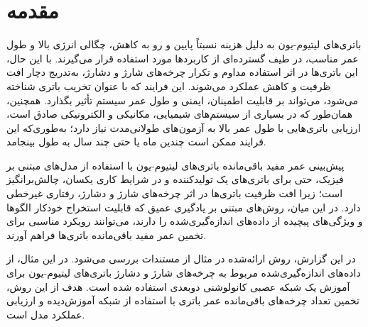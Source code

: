 \section{مقدمه}

باتری‌های لیتیوم-یون به دلیل هزینه نسبتاً پایین و رو به کاهش، چگالی انرژی بالا و طول عمر مناسب، در طیف گسترده‌ای از کاربردها مورد استفاده قرار می‌گیرند. با این حال، این باتری‌ها در اثر استفاده مداوم و تکرار چرخه‌های شارژ و دشارژ، به‌تدریج دچار افت ظرفیت و کاهش عملکرد می‌شوند. این فرایند که با عنوان تخریب باتری شناخته می‌شود، می‌تواند بر قابلیت اطمینان، ایمنی و طول عمر سیستم تأثیر بگذارد. همچنین، همان‌طور که در بسیاری از سیستم‌های شیمیایی، مکانیکی و الکترونیکی صادق است، ارزیابی باتری‌هایی با طول عمر بالا به آزمون‌های طولانی‌مدت نیاز دارد؛ به‌طوری‌که این فرایند ممکن است چندین ماه یا حتی چند سال به طول بینجامد.

پیش‌بینی عمر مفید باقی‌مانده باتری‌های لیتیوم-یون با استفاده از مدل‌های مبتنی بر فیزیک، حتی برای باتری‌های یک تولیدکننده و در شرایط کاری یکسان، چالش‌برانگیز است؛ زیرا افت ظرفیت باتری‌ها در اثر چرخه‌های شارژ و دشارژ، رفتاری غیرخطی دارد. در این میان، روش‌های مبتنی بر یادگیری عمیق که قابلیت استخراج خودکار الگوها و ویژگی‌های پیچیده از داده‌های اندازه‌گیری‌شده را دارند، می‌توانند رویکرد مناسبی برای تخمین عمر مفید باقی‌مانده باتری‌ها فراهم آورند.

در این گزارش، روش ارائه‌شده در مثال  از مستندات  \cite{mathworks} بررسی می‌شود. در این مثال، از داده‌های اندازه‌گیری‌شده مربوط به چرخه‌های شارژ و دشارژ باتری‌های لیتیوم-یون برای آموزش یک شبکه عصبی کانولوشنی دوبعدی استفاده شده است. هدف از این روش، تخمین تعداد چرخه‌های باقی‌مانده عمر باتری با استفاده از شبکه آموزش‌دیده و ارزیابی عملکرد مدل است.
